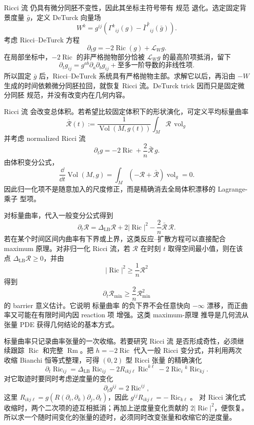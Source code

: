 Ricci 流 仍具有微分同胚不变性，因此其坐标主符号带有 规范 退化。选定固定背景度量 $\bar g$，定义 DeTurck 向量场
\begin{equation*}W^k
=g^{ij}\left(\Gamma^k{}_{ij}(g)-\bar\Gamma^k{}_{ij}(\bar g)\right).
\end{equation*}
考虑 Ricci--DeTurck 方程
\begin{equation*}\boxed{
\partial_tg=-2\operatorname{Ric}(g)+\mathcal L_Wg.}
\end{equation*}
在局部坐标中，$-2\operatorname{Ric}$ 的非严格抛物部分恰被 $\mathcal L_Wg$ 的最高阶项抵消，留下
\[
\partial_tg_{ij}
=g^{ab}\partial_a\partial_bg_{ij}
+\text{至多一阶导数的非线性项}.
\]
所以固定 $\bar g$ 后，Ricci--DeTurck 系统具有严格抛物主部。求解它以后，再沿由 $-W$ 生成的时间依赖微分同胚拉回，就恢复 Ricci 流。DeTurck trick 因而只是固定微分同胚 规范，并没有改变内在几何内容。

Ricci 流 会改变总体积。若希望比较固定体积下的形状演化，可定义平均标量曲率
\[
\bar{\mathcal R}(t)
:=\frac{1}{\operatorname{Vol}(M,g(t))}
\int_M\mathcal R\,\operatorname{vol}_g
\]
并考虑 normalized Ricci 流
\begin{equation*}\boxed{
\partial_tg
=-2\operatorname{Ric}+\frac{2}{n}\bar{\mathcal R}\,g
}.\end{equation*}
由体积变分公式，
\[
\frac{\dd}{\dd t}\operatorname{Vol}(M,g)
=\int_M
\left(-\mathcal R+\bar{\mathcal R}\right)\operatorname{vol}_g=0.
\]
因此归一化项不是随意加入的尺度修正，而是精确消去全局体积漂移的 Lagrange-乘子 型项。

对标量曲率，代入一般变分公式得到
\begin{equation*}\partial_t\mathcal R
=\Delta_{\mathrm{LB}}\mathcal R
+2|\operatorname{Ric}|^2
-\frac{2}{n}\bar{\mathcal R}\,\mathcal R.\end{equation*}
若在某个时间区间内曲率有下界或上界，这类反应--扩散方程可以直接配合 maximum 原理。对非归一化 Ricci 流，若 $\mathcal R$ 在时刻 $t$ 取得空间最小值，则在该点 $\Delta_{\mathrm{LB}}\mathcal R\ge0$，并由
\[
|\operatorname{Ric}|^2\ge\frac1n\mathcal R^2
\]
得到
\[
\partial_t\mathcal R_{\min}
\ge\frac{2}{n}\mathcal R_{\min}^2
\]
的 barrier 意义估计。它说明 标量曲率 的负下界不会任意快向 $-\infty$ 漂移，而正曲率又可能在有限时间内因 reaction 项 增强。这类 maximum-原理 推导是几何流从张量 PDE 获得几何结论的基本方式。

标量曲率只记录曲率张量的一次收缩。若要研究 Ricci 流 是否形成奇性，必须继续跟踪 $\operatorname{Ric}$ 和完整 $\operatorname{Rm}$。把 $h=-2\operatorname{Ric}$ 代入一般 Ricci 变分式，并利用两次 收缩 Bianchi 恒等式整理，可得 $(0,2)$ 型 Ricci 张量 的精确演化
\begin{equation*}\boxed{
\partial_t\operatorname{Ric}_{ij}
=\Delta_{\mathrm{LB}}\operatorname{Ric}_{ij}
-2R_{ikj\ell}\operatorname{Ric}^{k\ell}
-2\operatorname{Ric}_i{}^k\operatorname{Ric}_{kj}.
}\end{equation*}
对它取迹时要同时考虑逆度量的变化
\[
\partial_tg^{ij}=2\operatorname{Ric}^{ij},
\]
这里 $R_{ikj\ell}=g(R(\partial_i,\partial_k)\partial_j,\partial_\ell)$，因此 $g^{ij}R_{ikj\ell}=-\operatorname{Ric}_{k\ell}$。
对 Ricci 演化式收缩时，两个二次项的迹互相抵消；再加上逆度量变化贡献的 $2|\operatorname{Ric}|^2$，便恢复。
所以求一个随时间变化的张量的迹时，必须同时改变张量和收缩它的逆度量。

